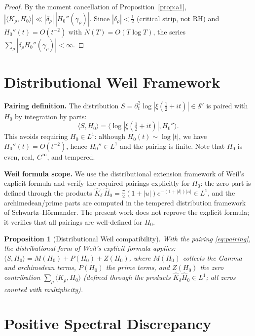\documentclass[11pt]{article}
\newtheorem{proposition}[theorem]{Proposition}
\begin{document}
\begin{proof}
By the moment cancellation of Proposition~\ref{prop:a1},
$|\langle K_\rho,H_0\rangle|\ll|\delta_\rho|\,|H_0''(\gamma_\rho)|$.
Since $|\delta_\rho|<\tfrac12$ (critical strip, not RH) and
$H_0''(t)=O(t^{-2})$ with $N(T)=O(T\log T)$, the series
$\sum_\rho|\delta_\rho H_0''(\gamma_\rho)|<\infty$.
\end{proof}

\section{Distributional Weil Framework}

\noindent\textbf{Pairing definition.} The distribution
$S=\partial_t^2\log|\xi(\tfrac12+it)|\in\mathcal S'$ is paired with $H_0$
by integration by parts:
\begin{equation}
\langle S,H_0\rangle=\langle \log|\xi(\tfrac12+it)|,H_0''\rangle.
\label{eq:pairing}
\end{equation}
This avoids requiring $H_0\in L^1$: although $H_0(t)\sim\log|t|$,
we have $H_0''(t)=O(t^{-2})$, hence $H_0''\in L^1$ and the pairing is
finite.  Note that $H_0$ is even, real, $C^\infty$, and tempered.

\noindent\textbf{Weil formula scope.} We use the distributional extension
framework of Weil's explicit formula and verify the required pairings
explicitly for $H_0$: the zero part is defined through the products
$\widehat K_\delta\,\widehat H_0=\tfrac{\pi}{2}(1+|u|)e^{-(1+|\delta|)|u|}\in L^1$,
and the archimedean/prime parts are computed in the tempered
distribution framework of Schwartz--H\"ormander.  The present work does
not reprove the explicit formula; it verifies that all pairings are
well-defined for $H_0$.

\begin{proposition}[Distributional Weil compatibility]\label{prop:weil}
With the pairing \eqref{eq:pairing}, the distributional form of Weil's
explicit formula applies:
$\langle S,H_0\rangle=M(H_0)+P(H_0)+Z(H_0)$, where $M(H_0)$ collects the
Gamma and archimedean terms, $P(H_0)$ the prime terms, and
$Z(H_0)$ the zero contribution $\sum_\rho\langle K_\rho,H_0\rangle$
(defined through the products $\widehat K_\delta\widehat H_0\in L^1$;
all zeros counted with multiplicity).
\end{proposition}

\section{Positive Spectral Discrepancy}
\end{document}
